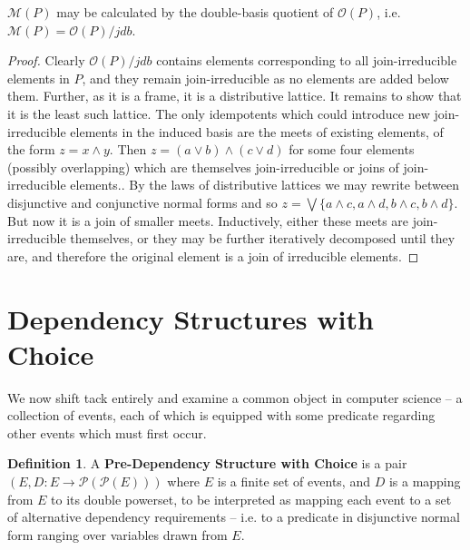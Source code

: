 \documentclass[hoptionsi,review,format=sigplan]{acmart}
\theoremstyle{definition}
\newtheorem{definition}{Definition}[section]
\newcommand{\Mcc}{\mathcal{M}}
\newcommand{\Oc}{\mathcal{O}}
\newcommand{\Pc}{\mathcal{P}}
\begin{document}
\begin{theorem}
\(\Mcc(P)\) may be calculated by the double-basis quotient of \(\Oc(P)\), i.e. \(\Mcc(P) = \Oc(P)/jdb\).
\end{theorem}
\begin{proof}
Clearly \(\Oc(P)/jdb\) contains elements corresponding to all join-irreducible elements in \(P\), and they remain join-irreducible as no elements are added below them. Further, as it is a frame, it is a distributive lattice. It remains to show that it is the least such lattice. The only idempotents which could introduce new join-irreducible elements in the induced basis are the meets of existing elements, of the form  \(z = x \wedge y\). Then \(z = (a \vee b) \wedge (c \vee d)\) for some four elements (possibly overlapping) which are themselves join-irreducible or joins of join-irreducible elements..  By the laws of distributive lattices we may rewrite between disjunctive and conjunctive normal forms and so \(z = \bigvee \{a \wedge c, a \wedge d, b \wedge c, b \wedge d\}\).  But now it is a join of smaller meets. Inductively, either these meets are join-irreducible themselves, or they may be further iteratively decomposed until they are, and therefore the original element is a join of irreducible elements.
\end{proof}





\section{Dependency Structures with Choice}
We now shift tack entirely and examine a common object in computer science -- a collection of events, each of which is equipped with some predicate regarding other events which must first occur. 

\begin{definition}
A \textbf{Pre-Dependency Structure with Choice} is a pair \((E, D : E \rightarrow \Pc(\Pc(E)))\) where \(E\) is a finite set of events, and \(D\) is a mapping from \(E\) to its double powerset, to be interpreted as mapping each event to a set of alternative dependency requirements -- i.e. to a predicate in disjunctive normal form ranging over variables drawn from \(E\). 
\end{definition}
\end{document}
